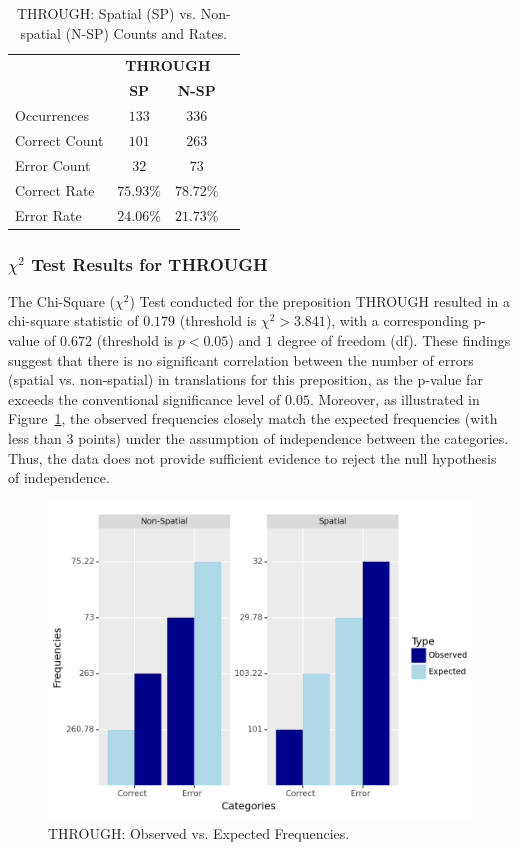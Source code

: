 \begin{table}[htb]
\centering
\begin{tabular}{@{}lccc@{}} \\
\toprule
& \multicolumn{2}{c}{\textbf{THROUGH}} \\ 
& \textbf{SP} & \textbf{N-SP} \\
Occurrences & $133$ & $336$ \\
Correct Count & $101$  & $263$\\
Error Count & $32$ & $73$ \\
\midrule
Correct Rate & $75.93\%$ & $\mathbf{78.72\%}$ \\
\midrule
Error Rate & $\mathbf{24.06\%}$ & $21.73\%$ \\
\bottomrule
\end{tabular}
\caption{THROUGH: Spatial (SP) vs. Non-spatial (N-SP) Counts and Rates.} \label{tab:through} 
\end{table}

\subsubsection{$\chi^2$ Test Results for THROUGH} 

The Chi-Square ($\chi^2$) Test conducted for the preposition THROUGH resulted in a chi-square statistic of $0.179$ (threshold is $\chi^2 > 3.841$), with a corresponding p-value of $0.672$ (threshold is $p < 0.05$) and $1$ degree of freedom (df). These findings suggest that there is no significant correlation between the number of errors (spatial vs. non-spatial) in translations for this preposition, as the p-value far exceeds the conventional significance level of $0.05$. Moreover, as illustrated in Figure~\ref{fig: through-chi}, the observed frequencies closely match the expected frequencies (with less than 3 points) under the assumption of independence between the categories. Thus, the data does not provide sufficient evidence to reject the null hypothesis of independence.

\begin{figure}[htb]
        \centering
        \includegraphics[width=.7\textwidth]{textual/Figuras/Results/Unknown-68.png}
        \caption{THROUGH: Observed vs. Expected Frequencies.}
        \label{fig: through-chi}
\end{figure}


